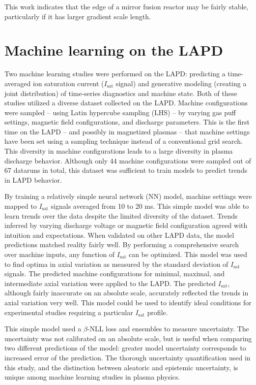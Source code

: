 This work indicates that the edge of a mirror fusion reactor may be fairly stable, particularly if it has larger gradient scale length.

\section{Machine learning on the LAPD}

Two machine learning studies were performed on the LAPD: predicting a time-averaged ion saturation current ($I_\text{sat}$ signal) and generative modeling (creating a joint distribution) of time-series diagnostics and machine state. Both of these studies utilized a diverse dataset collected on the LAPD. Machine configurations were sampled -- using Latin hypercube sampling (LHS) -- by varying gas puff settings, magnetic field configurations, and discharge parameters. This is the first time on the LAPD -- and possibly in magnetized plasmas -- that machine settings have been set using a sampling technique instead of a conventional grid search. This diversity in machine configurations leads to a large diversity in plasma discharge behavior. Although only 44 machine configurations were sampled out of 67 dataruns in total, this dataset was sufficient to train models to predict trends in LAPD behavior.

By training a relatively simple neural network (NN) model, machine settings were mapped to $I_\text{sat}$ signals averaged from 10 to 20 ms. This simple model was able to learn trends over the data despite the limited diversity of the dataset. Trends inferred by varying discharge voltage or magnetic field configuration agreed with intuition and expectations. When validated on other LAPD data, the model predictions matched reality fairly well. By performing a comprehensive search over machine inputs, any function of $I_\text{sat}$ can be optimized. This model was used to find optima in axial variation as measured by the standard deviation of $I_\text{sat}$ signals. The predicted machine configurations for minimal, maximal, and intermediate axial variation were applied to the LAPD. The predicted $I_\text{sat}$, although fairly inaccurate on an absolute scale, accurately reflected the trends in axial variation very well. This model could be used to identify ideal conditions for experimental studies requiring a particular $I_\text{sat}$ profile. 

This simple model used a $\beta$-NLL loss and ensembles to measure uncertainty. The uncertainty was not calibrated on an absolute scale, but is useful when comparing two different predictions of the model: greater model uncertainty corresponds to increased error of the prediction. The thorough uncertainty quantification used in this study, and the distinction between aleatoric and epistemic uncertainty, is unique among machine learning studies in plasma physics. 


